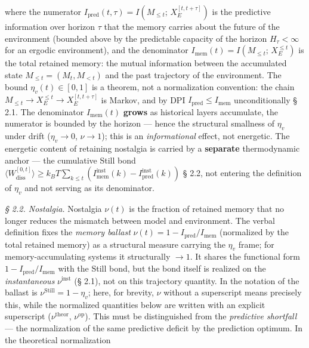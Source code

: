 \documentclass[12pt]{iopart}
\providecommand{\lt}{<}\providecommand{\gt}{>}
\begin{document}
where the numerator \(I_{\text{pred}}(t,\tau) = I(M_{\le t};\, X_E^{[t,t+\tau]})\) is the predictive information over horizon \(\tau\) that the memory carries about the future of the environment (bounded above by the predictable capacity of the horizon \(H_\tau < \infty\) for an ergodic environment), and the denominator \(I_{\text{mem}}(t) = I(M_{\le t};\, X_E^{\le t})\) is the total retained memory: the mutual information between the accumulated state \(M_{\le t} = (M_t, M_{\lt t})\) and the past trajectory of the environment. The bound \(\eta_v(t) \in [0,1]\) is a theorem, not a normalization convention: the chain \(M_{\le t} \to X_E^{\le t} \to X_E^{[t,t+\tau]}\) is Markov, and by DPI \(I_{\text{pred}} \le I_{\text{mem}}\) unconditionally \cite{Andriishin2026b} § 2.1. The denominator \(I_{\text{mem}}(t)\) \textbf{grows} as historical layers accumulate, the numerator is bounded by the horizon --- hence the structural smallness of \(\eta_v\) under drift (\(\eta_v \to 0\), \(\nu \to 1\)); this is an \emph{informational} effect, not energetic. The energetic content of retaining nostalgia is carried by a \textbf{separate} thermodynamic anchor --- the cumulative Still bond \(\langle W_{\text{diss}}^{[0,t]}\rangle \ge k_B T \sum_{k\le t}(I_{\text{mem}}^{\text{inst}}(k) - I_{\text{pred}}^{\text{inst}}(k))\) \cite{Still2012,Andriishin2026b} § 2.2, not entering the definition of \(\eta_v\) and not serving as its denominator.



\emph{§ 2.2. Nostalgia.} Nostalgia \(\nu(t)\) is the fraction of retained memory that no longer reduces the mismatch between model and environment. The verbal definition fixes the \emph{memory ballast} \(\nu(t) = 1 - I_{\text{pred}}/I_{\text{mem}}\) (normalized by the total retained memory) as a structural measure carrying the \(\eta_v\) frame; for memory-accumulating systems it structurally \(\to 1\). It shares the functional form \(1-I_{\text{pred}}/I_{\text{mem}}\) with the Still bond, but the bond itself is realized on the \emph{instantaneous} \(\nu^{\text{inst}}\) (§ 2.1), not on this trajectory quantity. In the notation of \cite{Andriishin2026b} the ballast is \(\nu^{\text{Still}} = 1 - \eta_v\); here, for brevity, \(\nu\) without a superscript means precisely this, while the normalized quantities below are written with an explicit superscript (\(\nu^{\text{theor}}\), \(\nu^{\text{op}}\)). This must be distinguished from the \emph{predictive shortfall} --- the normalization of the same predictive deficit by the prediction optimum. In the theoretical normalization \cite{Andriishin2026b}
\end{document}
